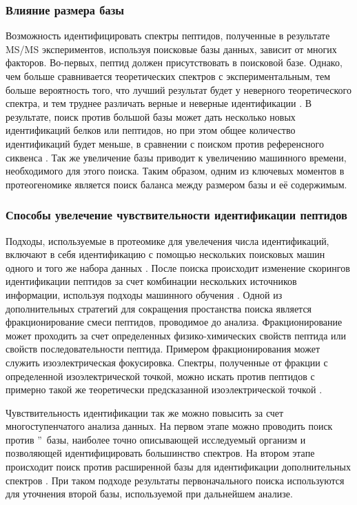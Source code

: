 \subsubsection{Влияние размера базы}
Возможность идентифицировать спектры пептидов, полученные в результате MS/MS экспериментов, используя поисковые базы данных, зависит от многих факторов. Во-первых, пептид должен присутствовать в поисковой базе. Однако, чем больше сравнивается теоретических спектров с экспериментальным, тем больше вероятность того, что лучший результат будет у неверного теоретического спектра, и тем труднее различать верные и неверные идентификации \cite{nesvizhskii2010survey}. В результате, поиск против большой базы может дать несколько новых идентификаций белков или пептидов, но при этом общее количество идентификаций будет меньше, в сравнении с поиском против референсного сиквенса \cite{blakeley2012addressing, krug2013deep}. Так же увеличение базы приводит к увеличению машинного времени, необходимого для этого поиска. Таким образом, одним из ключевых моментов в протеогеномике является поиск баланса между размером базы и её содержимым.

\subsubsection{Способы увелечение чувствительности идентификации пептидов}
Подходы, используемые в протеомике для увелечения числа идентификаций, включают в себя идентификацию с помощью нескольких поисковых машин одного и того же набора данных \cite{shteynberg2013combining}. После поиска происходит изменение скорингов идентификации пептидов за счет комбинации нескольких источников информации, используя подходы машинного обучения \cite{nesvizhskii2010survey}. Одной из дополнительных стратегий для сокращения простанства поиска является фракционирование смеси пептидов, проводимое до  анализа. Фракционирование может проходить за счет определенных физико-химических свойств пептида или свойств последовательности пептида. Примером фракционирования может служить изоэлектрическая фокусировка. Спектры, полученные от фракции с определенной изоэлектрической точкой, можно искать против пептидов с примерно такой же теоретически предсказанной изоэлектрической точкой \cite{branca2014hirief}. 

Чувствительность идентификации так же можно повысить за счет многоступенчатого анализа данных. На первом этапе можно проводить поиск против \textquotedblright\ базы, наиболее точно описывающей исследуемый организм и позволяющей идентифицировать большинство спектров. На втором этапе происходит поиск против расширенной базы для идентификации дополнительных спектров \cite{ning2010computational, helmy2012mass}. При таком подходе результаты первоначального поиска используются для уточнения второй базы, используемой при дальнейшем анализе. 

